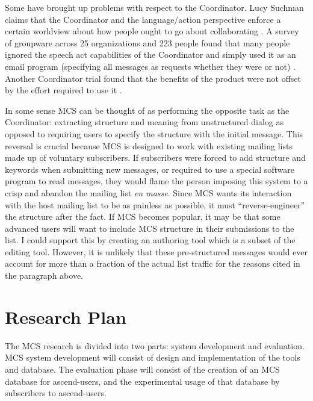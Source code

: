 Some have brought up problems with respect to the Coordinator. Lucy Suchman
claims that the Coordinator and the language/action perspective enforce a
certain worldview about how people ought to go about collaborating
\cite{Suchman93}. A survey of groupware across 25 organizations and 223 people
found that many people ignored the speech act capabilities of the Coordinator
and simply used it as an email program (specifying all messages as requests
whether they were or not) \cite{Bullen90a}. Another Coordinator trial found
that the benefits of the product were not offset by the effort required to use
it \cite{Carasik88}.

In some sense MCS can be thought of as performing the opposite task as the
Coordinator: extracting structure and meaning from unstructured dialog as
opposed to requiring users to specify the structure with the initial message.
This reversal is crucial because MCS is designed to work with existing mailing
lists made up of voluntary subscribers. If subscribers were forced to add
structure and keywords when submitting new messages, or required to use a
special software program to read messages, they would flame the person imposing
this system to a crisp and abandon the mailing list {\em en masse}. Since MCS
wants its interaction with the host mailing list to be as painless as possible,
it must ``reverse-engineer'' the structure after the fact. If MCS becomes
popular, it may be that some advanced users will want to include MCS structure
in their submissions to the list. I could support this by creating an
authoring tool which is a subset of the editing tool. However, it is unlikely
that these pre-structured messages would ever account for more than a fraction
of the actual list traffic for the reasons cited in the paragraph above.


\chapter{Research Plan}
The MCS research is divided into two parts: system development and evaluation.
MCS system development will consist of design and implementation of the tools
and database. The evaluation phase will consist of the creation of an MCS
database for ascend-users, and the experimental usage of that database by
subscribers to ascend-users.

